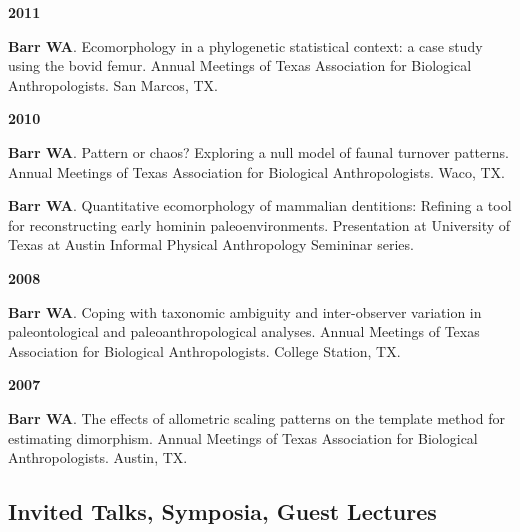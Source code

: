 \documentclass{article}
\begin{document}
\begin{description*}
\begin{minipage}{\linewidth}
\item[] {\bfseries 2011}
\item[] {\bfseries Barr WA}. Ecomorphology in a phylogenetic statistical context: a case study using the bovid femur. Annual Meetings of Texas Association for Biological Anthropologists. San Marcos, TX.
\end{minipage}
\end{description*}


\begin{description*}
\item[] {\bfseries 2010}
\item[] {\bfseries Barr WA}. Pattern or chaos? Exploring a null model of faunal turnover patterns. Annual Meetings of Texas Association for Biological Anthropologists. Waco, TX.

\item[] {\bfseries Barr WA}. Quantitative ecomorphology of mammalian dentitions: Refining a tool for reconstructing early hominin paleoenvironments. Presentation at University of Texas at Austin Informal Physical Anthropology Semininar series.
\end{description*}
\begin{description*}
\item[] {\bfseries 2008}
\item[] {\bfseries Barr WA}. Coping with taxonomic ambiguity and inter-observer variation in paleontological and paleoanthropological analyses. Annual Meetings of Texas Association for Biological Anthropologists. College Station, TX.
\end{description*}
\begin{description*}
\item[] {\bfseries 2007}
\item[] {\bfseries Barr WA}. The effects of allometric scaling patterns on the template method for estimating dimorphism. Annual Meetings of Texas Association for Biological Anthropologists. Austin, TX.
\end{description*}


\subsection*{Invited Talks, Symposia, Guest Lectures}
\end{document}
